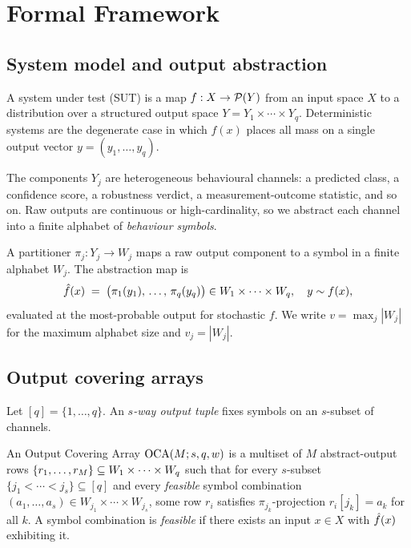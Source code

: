 \section{Formal Framework}
\label{sec:framework}

\subsection{System model and output abstraction}

\begin{definition}
\label{def:sut}
A system under test (SUT) is a map $f: X \to \mathcal{P}(Y)$ from an input space $X$ to a
distribution over a structured output space $Y = Y_1 \times \cdots \times Y_q$.
Deterministic systems are the degenerate case in which $f(x)$ places all mass on
a single output vector $y = (y_1,\dots,y_q)$.
\end{definition}

The components $Y_j$ are heterogeneous behavioural channels: a predicted class, a
confidence score, a robustness verdict, a measurement-outcome statistic, and so
on. Raw outputs are continuous or high-cardinality, so we abstract each channel
into a finite alphabet of \emph{behaviour symbols}.

\begin{definition}
\label{def:partition}
A partitioner $\pi_j: Y_j \to W_j$ maps a raw output component to a symbol in a
finite alphabet $W_j$. The abstraction map is
\[
\hat{f}(x) \;=\; \bigl(\pi_1(y_1),\,\dots,\,\pi_q(y_q)\bigr) \in W_1\times\cdots\times W_q,
\quad y \sim f(x),
\]
evaluated at the most-probable output for stochastic $f$. We write $v = \max_j
|W_j|$ for the maximum alphabet size and $v_j = |W_j|$.
\end{definition}

\subsection{Output covering arrays}

Let $[q]=\{1,\dots,q\}$. An \emph{$s$-way output tuple} fixes symbols on an
$s$-subset of channels.

\begin{definition}
\label{def:oca}
An Output Covering Array $\mathrm{OCA}(M;s,q,w)$ is a multiset of $M$ abstract-output rows
$\{r_1,\dots,r_M\} \subseteq W_1\times\cdots\times W_q$ such that for every $s$-subset
$\{j_1<\cdots<j_s\}\subseteq[q]$ and every \emph{feasible} symbol combination
$(a_1,\dots,a_s)\in W_{j_1}\times\cdots\times W_{j_s}$, some row $r_i$ satisfies
$\pi_{j_k}$-projection $r_i[j_k]=a_k$ for all $k$. A symbol combination is
\emph{feasible} if there exists an input $x\in X$ with $\hat{f}(x)$ exhibiting it.
\end{definition}

